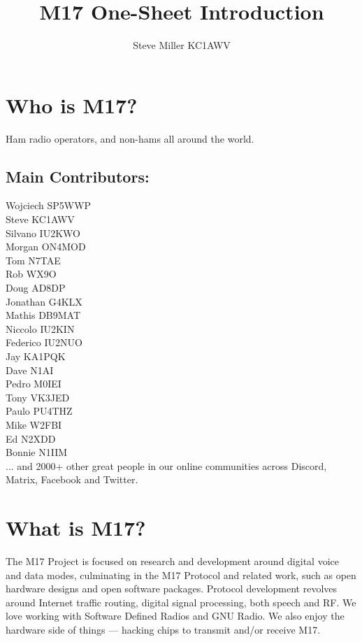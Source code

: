 \documentclass[10pt,letterpaper,notitlepage]{article}
\author{Steve Miller KC1AWV}
\title{M17 One-Sheet Introduction}
\begin{document}
  \begin{multicols}{2}
  \section*{Who is M17?}
    Ham radio operators, and non-hams all around the world.
    \subsection*{Main Contributors:}
      Wojciech SP5WWP\\
      Steve KC1AWV\\
      Silvano IU2KWO\\
      Morgan ON4MOD\\
      Tom N7TAE\\
      Rob WX9O\\
      Doug AD8DP\\
      Jonathan G4KLX\\
      Mathis DB9MAT\\
      Niccolo IU2KIN\\
      Federico IU2NUO\\
      Jay KA1PQK\\
      Dave N1AI\\
      Pedro M0IEI\\
      Tony VK3JED\\
      Paulo PU4THZ\\
      Mike W2FBI\\
      Ed N2XDD\\
      Bonnie N1IIM\\
      \justifying
      ... and 2000+ other great people in our online communities
      across Discord, Matrix, Facebook and Twitter.
  \section*{What is M17?}
    \justifying
    The M17 Project is focused on research and development around digital voice and data modes, culminating in the M17 Protocol and related work, such as open hardware designs and open software packages. Protocol development revolves around Internet traffic routing, digital signal processing, both speech and RF. We love working with Software Defined Radios and GNU Radio. We also enjoy the hardware side of things — hacking chips to transmit and/or receive M17.
  \columnbreak

\end{multicols}
\end{document}
